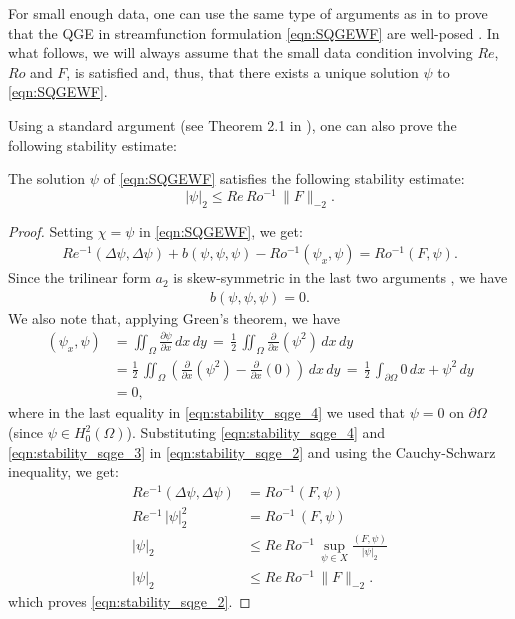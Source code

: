 For small enough data, one can use the same type of arguments as in
\cite{Girault79,Girault86} to prove that the QGE in streamfunction formulation
\eqref{eqn:SQGEWF} are well-posed \cite{Barcilon,Ipatova10,Wolansky88}.  In what
follows, we will always assume that the small data condition involving $Re$,
$Ro$ and $F$, is satisfied and, thus, that there exists a unique solution $\psi$
to \eqref{eqn:SQGEWF}.

Using a standard argument (see Theorem 2.1 in \cite{Cayco86}), one can also
prove the following stability estimate:
\begin{thm} \label{thm:stability_sqge}
  The solution $\psi$ of \eqref{eqn:SQGEWF} satisfies the following stability
  estimate:
  \begin{equation}
   |\psi|_2
   \le Re \, Ro^{-1} \, \| F \|_{-2} .
   \label{eqn:stability_sqge}
  \end{equation}
\end{thm}
\begin{proof}
Setting $\chi = \psi$ in \eqref{eqn:SQGEWF}, we get:
\begin{align}
  Re^{-1} (\Delta \psi, \Delta \psi) + b(\psi,\psi, \psi) - Ro^{-1}(\psi_x, \psi)
    = Ro^{-1} (F,\psi) .
\label{eqn:stability_sqge_2}
\end{align}
Since the trilinear form $a_2$ is skew-symmetric in the last two arguments
\cite{Girault79,Girault86,Gunzburger89}, we have
\begin{align}
  b(\psi,\psi, \psi) = 0 .
  \label{eqn:stability_sqge_3}
\end{align}
We also note that, applying Green's theorem, we have
\begin{align}
  (\psi_x,\psi) &= \iint_{\Omega} \frac{\partial \psi}{\partial x} \, dx \, dy
    \, = \, \frac{1}{2} \, \iint_{\Omega} \frac{\partial}{\partial x} (\psi^2) \, dx \, dy \nonumber \\
  &= \frac{1}{2} \, \iint_{\Omega} \left( \frac{\partial}{\partial x} (\psi^2)
    - \frac{\partial}{\partial x} (0) \right) \, dx \, dy
    \, = \,  \frac{1}{2} \, \int_{\partial \Omega} 0 \, dx + \psi^2 \, dy \nonumber \\
  &= 0 ,
\label{eqn:stability_sqge_4}
\end{align}
where in the last equality in \eqref{eqn:stability_sqge_4} we used that $\psi =
0$ on $\partial \Omega$ (since $\psi \in H_0^2(\Omega)$).  Substituting
\eqref{eqn:stability_sqge_4} and \eqref{eqn:stability_sqge_3} in
\eqref{eqn:stability_sqge_2} and using the Cauchy-Schwarz inequality, we get:
\begin{align}
  Re^{-1} (\Delta \psi, \Delta \psi) &= Ro^{-1} (F,\psi) \nonumber \\
  Re^{-1}\, |\psi|_2^2 &= Ro^{-1}\, (F,\psi) \\
  |\psi|_2 &\le Re\, Ro^{-1}\,\sup_{\psi \in X} \frac{(F,\psi)}{|\psi|_2} \nonumber \\
  |\psi|_2 &\le Re\, Ro^{-1}\, \|F\|_{-2}.
  \label{eqn:stability_sqge_5}
\end{align}
which proves \eqref{eqn:stability_sqge_2}.
\end{proof}
